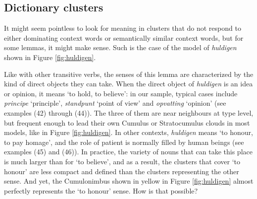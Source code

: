 \documentclass[
]{book}
\begin{document}
\hypertarget{huldigen}{%
\subsection{Dictionary clusters}\label{huldigen}}

It might seem pointless to look for meaning in clusters that do not respond to either dominating context words or semantically similar context words, but for some lemmas, it might make sense. Such is the case of the model of \emph{huldigen} shown in Figure \ref{fig:huldigen}.

Like with other transitive verbs, the senses of this lemma are characterized by the kind of direct objects they can take. When the direct object of \emph{huldigen} is an idea or opinion, it means `to hold, to believe': in our sample, typical cases include \emph{principe} `principle', \emph{standpunt} `point of view' and \emph{opvatting} `opinion' (see examples (42) through (44)). The three of them are near neighbours at type level, but frequent enough to lead their own Cumulus or Stratocumulus clouds in most models, like in Figure \ref{fig:huldigen}.
In other contexts, \emph{huldigen} means `to honour, to pay homage', and the role of patient is normally filled by human beings (see examples (45) and (46)). In practice, the variety of nouns that can take this place is much larger than for `to believe', and as a result, the clusters that cover `to honour' are less compact and defined than the clusters representing the other sense. And yet, the Cumulonimbus shown in yellow in Figure \ref{fig:huldigen} almost perfectly represents the `to honour' sense. How is that possible?
\end{document}
